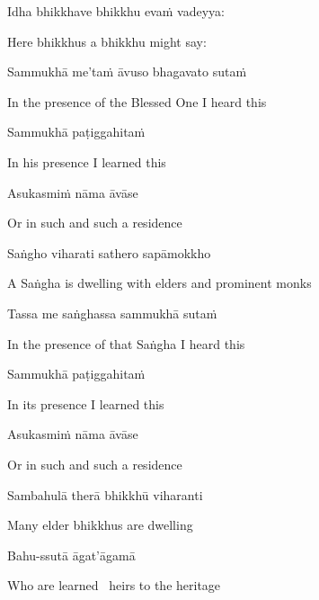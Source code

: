Idha bhikkhave bhikkhu evaṁ vadeyya:

\begin{english}
  Here bhikkhus a bhikkhu might say:
\end{english}

Sammukhā me'taṁ āvuso bhagavato sutaṁ

\begin{english}
  In the presence of the Blessed One I heard this
\end{english}

Sammukhā paṭiggahitaṁ

\begin{english}
  In his presence I learned this
\end{english}

Asukasmiṁ nāma āvāse

\begin{english}
  Or in such and such a residence
\end{english}

Saṅgho viharati sathero sapāmokkho

\begin{english}
  A Saṅgha is dwelling with elders and prominent monks
\end{english}

Tassa me saṅghassa sammukhā sutaṁ

\begin{english}
  In the presence of that Saṅgha I heard this
\end{english}

Sammukhā paṭiggahitaṁ

\begin{english}
  In its presence I learned this
\end{english}

\ifninebythirteenversion\clearpage\fi

Asukasmiṁ nāma āvāse

\begin{english}
  Or in such and such a residence
\end{english}

Sambahulā therā bhikkhū viharanti

\begin{english}
  Many elder bhikkhus are dwelling
\end{english}

Bahu-ssutā āgat'āgamā

\begin{english}
  Who are learned \breathmark\ heirs to the heritage
\end{english}


